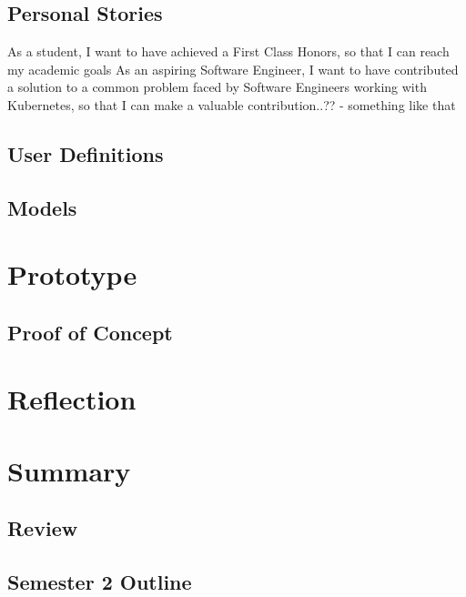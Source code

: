 \documentclass{article}
\begin{document}
\subsection{Personal Stories}
As a student, I want to have achieved a First Class Honors, so that I can reach my academic goals
As an aspiring Software Engineer, I want to have contributed a solution to a common problem faced by Software Engineers working with Kubernetes, so that I can make a valuable contribution..?? - something like that



\subsection{User Definitions}



\subsection{Models}



\section{Prototype}



\subsection{Proof of Concept}



\section{Reflection}



\section{Summary}



\subsection{Review}



\subsection{Semester 2 Outline}
\end{document}
